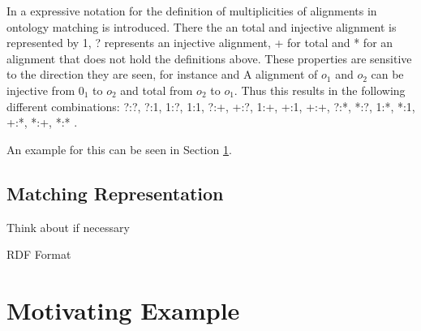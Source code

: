 \documentclass[11pt,titlepage,oneside,openany,a4paper]{report}
\begin{document}
In \cite{euzenat2003towards} a expressive notation for the definition of multiplicities of alignments in ontology matching is introduced. There the an total and injective alignment is represented by 1, ? represents an injective alignment, + for total and * for an alignment that does not hold the definitions above. These properties are sensitive to the direction they are seen, for instance and A alignment of $o_1$ and $o_2$ can be injective from $0_1$ to $o_2$ and total from $o_2$ to $o_1$. Thus this results in the following different combinations: ?:?, ?:1, 1:?, 1:1, ?:+, +:?, 1:+, +:1, +:+, ?:*, *:?, 1:*, *:1, +:*, *:+, *:* .

An example for this can be seen in Section \ref{sec:motivating_example}.
\subsection{Matching Representation}
\begin{LARGE}
Think about if necessary
\end{LARGE}

RDF Format \cite{euzenat2004api}

\section{Motivating Example}
\label{sec:motivating_example}
\end{document}
